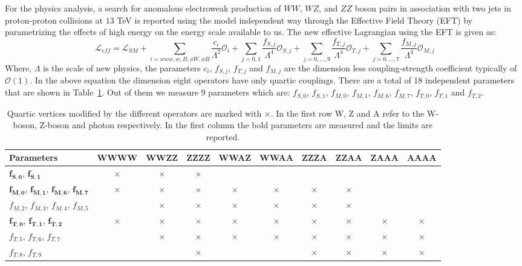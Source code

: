 For the physics analysis, a search for anomalous electroweak production of $WW$, $WZ$, and $ZZ$ boson pairs in association with two jets in proton-proton collisions at $13$ TeV is reported using the model independent way through the Effective Field Theory (EFT) by parametrizing the effects of high energy on the energy scale available to us. The new effective Lagrangian using the EFT is given as:
\begin{equation}
	\mathcal{L}_{eff} = \mathcal{L}_{SM} + \sum_{i=www,w,B, \phi W, \phi B} \frac{c_i}{\Lambda^2} {\mathcal{O}}_i + \sum_{j=0,1}\frac{f_{S,j}}{\Lambda^4} \mathcal{O}_{S,j} + \sum_{j=0,...,9}\frac{f_{T,j}}{\Lambda^4} \mathcal{O}_{T,j}  + \sum_{j=0,...,7} \frac{f_{M,j}}{\Lambda^4} \mathcal{O}_{M,j}
\end{equation}
Where, $\Lambda$ is the scale of new physics, the parameters $c_i$, $f_{S,j}$, $f_{T,j}$ and $f_{M,j}$ are the dimension less coupling-strength coefficient typically of $\mathcal{O}(1)$. In the above equation the dimension eight operators have only quartic couplings. There are a total of 18 independent parameters that are shown in Table~\ref{table:aQGC_alloperator}. Out of them we measure 9 parameters which are: $f_{S,0}$, $f_{S,1}$, $f_{M,0}$, $f_{M,1}$, $f_{M,6}$, $f_{M,7}$, $f_{T,0}$, $f_{T,1}$ and $f_{T,2}$. 
\begin{table}
\centering
{\scriptsize
\begin{tabular}[!htbp]{|l | c  |c  |c  |c  |c  |c  |c | c  |c |}
\hline
 Parameters   & WWWW & WWZZ & ZZZZ & WWAZ & WWAA & ZZZA & ZZAA & ZAAA & AAAA \\
\hline
$\bm{f_{S,0}}$, $\bm{f_{S,1}}$ &$\bm{\times}$ & $\bm{\times}$&$\bm{\times}$ & & & & & & \\
\hline
$\bm{f_{M,0}}$, $\bm{f_{M,1}}$, $\bm{f_{M,6}}$, $\bm{f_{M,7}}$  &$\bm{\times}$ &$\bm{\times}$ &$\bm{\times}$ &$\bm{\times}$ &$\bm{\times}$ &$\bm{\times}$ &$\bm{\times}$ & & \\
\hline
$f_{M,2}$, $f_{M,3}$, $f_{M,4}$, $f_{M,5}$  & &$\times$ &$\times$ &$\times$ &$\times$ &$\times$ &$\times$ & & \\
\hline
$\bm{f_{T,0}}$, $\bm{f_{T,1}}$, $\bm{f_{T,2}}$ &$\bm{\times}$ &$\bm{\times}$ &$\bm{\times}$ &$\bm{\times}$ &$\bm{\times}$ &$\bm{\times}$ &$\bm{\times}$ &$\bm{\times}$ &$\bm{\times}$ \\
\hline
$f_{T,5}$, $f_{T,6}$, $f_{T,7}$ & &$\times$ &$\times$ &$\times$ &$\times$ &$\times$ &$\times$ &$\times$ &$\times$ \\
\hline
$f_{T,8}$, $f_{T,9}$  & & &$\times$ & & &$\times$ &$\times$ &$\times$ &$\times$ \\
\hline
\end{tabular}
\caption{Quartic vertices modified by the different operators are marked with $\times$. In the first row W, Z and A refer to the W-boson, Z-boson and photon respectively. In the first column the bold parameters are measured and the limits are reported.}
\label{table:aQGC_alloperator}}
\end{table}
